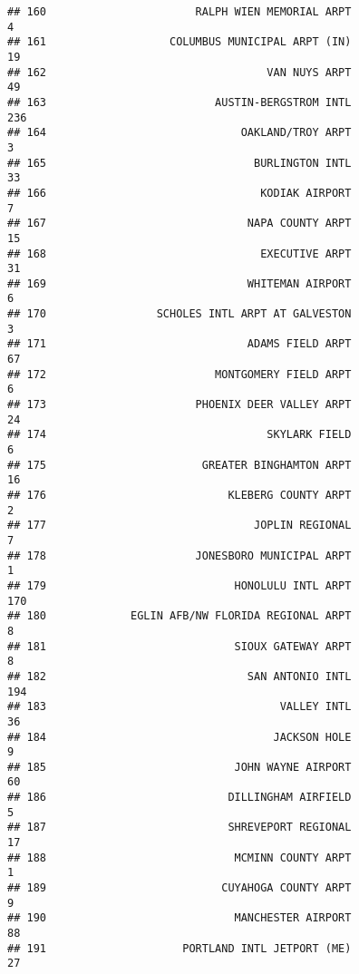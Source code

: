\documentclass[
]{article}
\begin{document}
\begin{verbatim}
## 160                       RALPH WIEN MEMORIAL ARPT                           4
## 161                   COLUMBUS MUNICIPAL ARPT (IN)                          19
## 162                                  VAN NUYS ARPT                          49
## 163                          AUSTIN-BERGSTROM INTL                         236
## 164                              OAKLAND/TROY ARPT                           3
## 165                                BURLINGTON INTL                          33
## 166                                 KODIAK AIRPORT                           7
## 167                               NAPA COUNTY ARPT                          15
## 168                                 EXECUTIVE ARPT                          31
## 169                               WHITEMAN AIRPORT                           6
## 170                 SCHOLES INTL ARPT AT GALVESTON                           3
## 171                               ADAMS FIELD ARPT                          67
## 172                          MONTGOMERY FIELD ARPT                           6
## 173                       PHOENIX DEER VALLEY ARPT                          24
## 174                                  SKYLARK FIELD                           6
## 175                        GREATER BINGHAMTON ARPT                          16
## 176                            KLEBERG COUNTY ARPT                           2
## 177                                JOPLIN REGIONAL                           7
## 178                       JONESBORO MUNICIPAL ARPT                           1
## 179                             HONOLULU INTL ARPT                         170
## 180             EGLIN AFB/NW FLORIDA REGIONAL ARPT                           8
## 181                             SIOUX GATEWAY ARPT                           8
## 182                               SAN ANTONIO INTL                         194
## 183                                    VALLEY INTL                          36
## 184                                   JACKSON HOLE                           9
## 185                             JOHN WAYNE AIRPORT                          60
## 186                            DILLINGHAM AIRFIELD                           5
## 187                            SHREVEPORT REGIONAL                          17
## 188                             MCMINN COUNTY ARPT                           1
## 189                           CUYAHOGA COUNTY ARPT                           9
## 190                             MANCHESTER AIRPORT                          88
## 191                     PORTLAND INTL JETPORT (ME)                          27

\end{verbatim}
\end{document}
